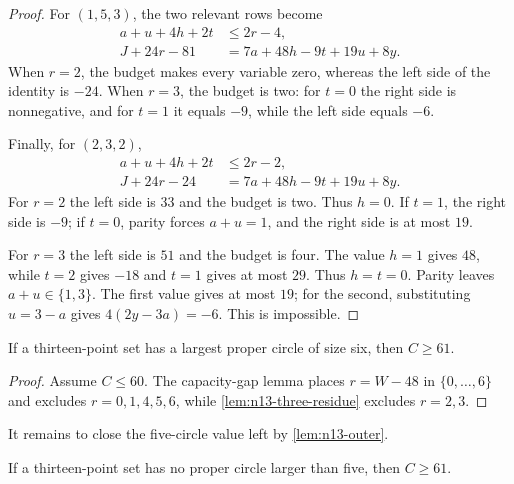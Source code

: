 \begin{proof}
For $(1,5,3)$, the two relevant rows become
\begin{align*}
 a+u+4h+2t&\leq2r-4,\\
 J+24r-81&=7a+48h-9t+19u+8y.
\end{align*}
When $r=2$, the budget makes every variable zero, whereas the left side
of the identity is $-24$.  When $r=3$, the budget is two: for $t=0$ the
right side is nonnegative, and for $t=1$ it equals $-9$, while the left
side equals $-6$.

Finally, for $(2,3,2)$,
\begin{align*}
 a+u+4h+2t&\leq2r-2,\\
 J+24r-24&=7a+48h-9t+19u+8y. 
\end{align*}
For $r=2$ the left side is $33$ and the budget is two.  Thus $h=0$.
If $t=1$, the right side is $-9$; if $t=0$, parity forces
$a+u=1$, and the right side is at most $19$.

For $r=3$ the left side is $51$ and the budget is four.  The value $h=1$
gives $48$, while $t=2$ gives $-18$ and $t=1$ gives at most $29$.
Thus $h=t=0$.  Parity leaves $a+u\in\{1,3\}$.  The first value gives at
most $19$; for the second, substituting $u=3-a$ gives
$4(2y-3a)=-6$.  This is impossible.
\end{proof}

\begin{proposition}
\label{prop:n13-gamma6}
If a thirteen-point set has a largest proper circle of size six, then
$C\geq61$.
\end{proposition}

\begin{proof}
Assume $C\leq60$.  The capacity-gap lemma places
$r=W-48$ in $\{0,\ldots,6\}$ and excludes $r=0,1,4,5,6$, while
\cref{lem:n13-three-residue} excludes $r=2,3$.
\end{proof}

It remains to close the five-circle value left by \cref{lem:n13-outer}.

\begin{lemma}
\label{lem:n13-gamma5}
If a thirteen-point set has no proper circle larger than five, then
$C\geq61$.
\end{lemma}

